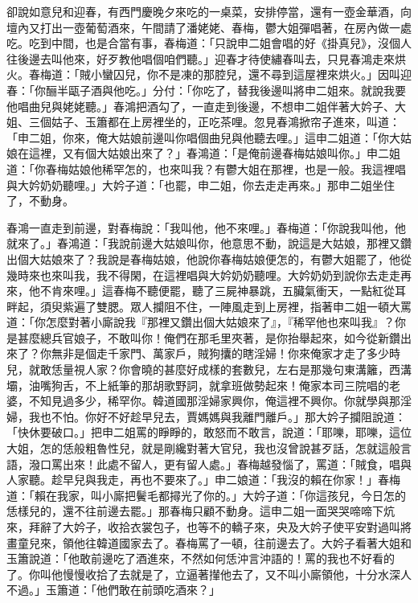 卻說如意兒和迎春，有西門慶晚夕來吃的一桌菜，安排停當，還有一壺金華酒，向壇內又打出一壺葡萄酒來，午間請了潘姥姥、春梅，鬱大姐彈唱著，在房內做一處吃。吃到中間，也是合當有事，春梅道：「只說申二姐會唱的好《掛真兒》，沒個人往後邊去叫他來，好歹教他唱個咱們聽。」迎春才待使繡春叫去，只見春鴻走來烘火。春梅道：「賊小蠻囚兒，你不是凍的那腔兒，還不尋到這屋裡來烘火。」因叫迎春：「你酾半甌子酒與他吃。」分付：「你吃了，替我後邊叫將申二姐來。就說我要他唱曲兒與姥姥聽。」春鴻把酒勾了，一直走到後邊，不想申二姐伴著大妗子、大姐、三個姑子、玉簫都在上房裡坐的，正吃茶哩。忽見春鴻掀帘子進來，叫道：「申二姐，你來，俺大姑娘前邊叫你唱個曲兒與他聽去哩。」這申二姐道：「你大姑娘在這裡，又有個大姑娘出來了？」春鴻道：「是俺前邊春梅姑娘叫你。」申二姐道：「你春梅姑娘他稀罕怎的，也來叫我？有鬱大姐在那裡，也是一般。我這裡唱與大妗奶奶聽哩。」大妗子道：「也罷，申二姐，你去走走再來。」那申二姐坐住了，不動身。

春鴻一直走到前邊，對春梅說：「我叫他，他不來哩。」春梅道：「你說我叫他，他就來了。」春鴻道：「我說前邊大姑娘叫你，他意思不動，說這是大姑娘，那裡又鑽出個大姑娘來了？我說是春梅姑娘，他說你春梅姑娘便怎的，有鬱大姐罷了，他從幾時來也來叫我，我不得閑，在這裡唱與大妗奶奶聽哩。大妗奶奶到說你去走走再來，他不肯來哩。」這春梅不聽便罷，聽了三屍神暴跳，五臟氣衝天，一點紅從耳畔起，須臾紫遍了雙腮。眾人攔阻不住，一陣風走到上房裡，指著申二姐一頓大罵道：「你怎麼對著小廝說我『那裡又鑽出個大姑娘來了』，『稀罕他也來叫我』？你是甚麼總兵官娘子，不敢叫你！俺們在那毛里夾著，是你抬舉起來，如今從新鑽出來了？你無非是個走千家門、萬家戶，賊狗攮的瞎淫婦！你來俺家才走了多少時兒，就敢恁量視人家？你會曉的甚麼好成樣的套數兒，左右是那幾句東溝籬，西溝壩，油嘴狗舌，不上紙筆的那胡歌野詞，就拿班做勢起來！俺家本司三院唱的老婆，不知見過多少，稀罕你。韓道國那淫婦家興你，俺這裡不興你。你就學與那淫婦，我也不怕。你好不好趁早兒去，賈媽媽與我離門離戶。」那大妗子攔阻說道：「快休要破口。」把申二姐罵的睜睜的，敢怒而不敢言，說道：「耶嚛，耶嚛，這位大姐，怎的恁般粗魯性兒，就是剛纔對著大官兒，我也沒曾說甚歹話，怎就這般言語，潑口罵出來！此處不留人，更有留人處。」春梅越發惱了，罵道：「賊食，唱與人家聽。趁早兒與我走，再也不要來了。」申二娘道：「我沒的賴在你家！」春梅道：「賴在我家，叫小廝把鬢毛都撏光了你的。」大妗子道：「你這孩兒，今日怎的恁樣兒的，還不往前邊去罷。」那春梅只顧不動身。這申二姐一面哭哭啼啼下炕來，拜辭了大妗子，收拾衣裳包子，也等不的轎子來，央及大妗子使平安對過叫將畫童兒來，領他往韓道國家去了。春梅罵了一頓，往前邊去了。大妗子看著大姐和玉簫說道：「他敢前邊吃了酒進來，不然如何恁沖言沖語的！罵的我也不好看的了。你叫他慢慢收拾了去就是了，立逼著攆他去了，又不叫小廝領他，十分水深人不過。」玉簫道：「他們敢在前頭吃酒來？」

